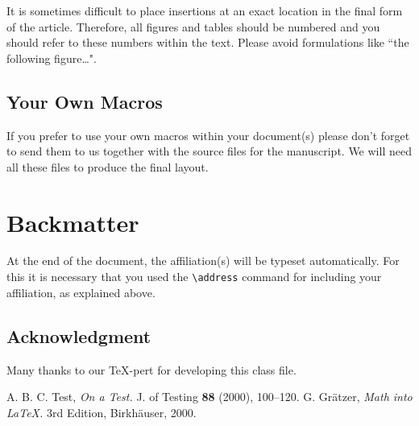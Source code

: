 \documentclass{birkjour}
\theoremstyle{definition}
\theoremstyle{remark}
\numberwithin{equation}{section}
\begin{document}
It is sometimes difficult to place insertions at an exact location
in the final form of the article. Therefore, all figures and tables
should be numbered and you should refer to these numbers within
the text. Please avoid formulations like ``the following
figure\dots".

\subsection{Your Own Macros}

If you prefer to use your own macros within your document(s)
please don't forget to send them to us together with the source
files for the manuscript. We will need all these files to produce
the final layout.


\section{Backmatter}

At the end of the document, the affiliation(s) will be typeset
automatically. For this it is necessary that you used the \verb+\address+ command for including your affiliation, as explained above.



\subsection*{Acknowledgment}
Many thanks to our \TeX-pert for developing this class file.


\begin{thebibliography}{1}
 A. B. C. Test, \textit{On a Test.} J. of Testing
\textbf{88} (2000), 100--120.
 G. Gr\"atzer, \textit{Math into \LaTeX.} 3rd Edition,
Birkh\"auser, 2000.
\end{thebibliography}

\end{document}
